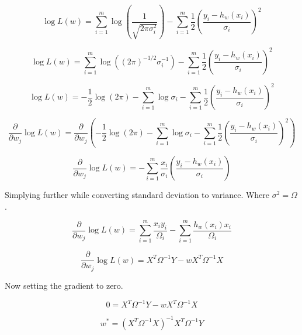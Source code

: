 \documentclass{report}
\begin{document}
  \begin{equation}
     \log L(w) = \sum_{i=1}^{m} \log \left(\frac{1}{\sqrt{2\pi\sigma_i^2}}\right)
     - \sum_{i=1}^{m} \frac{1}{2}\left(\frac{y_i-h_w(x_i)}{\sigma_i}\right)^2
  \end{equation}

  \begin{equation}
     \log L(w) = \sum_{i=1}^{m} \log \left((2\pi)^{-1/2}\sigma_i^{-1}\right)
     - \sum_{i=1}^{m} \frac{1}{2}\left(\frac{y_i-h_w(x_i)}{\sigma_i}\right)^2
  \end{equation}

  \begin{equation}
     \log L(w) = -\frac{1}{2} \log(2\pi)
     - \sum_{i=1}^{m} \log \sigma_i
     - \sum_{i=1}^{m} \frac{1}{2}\left(\frac{y_i-h_w(x_i)}{\sigma_i}\right)^2
  \end{equation}

\begin{equation}
     \frac{\partial}{\partial w_j} \log L(w)
     = \frac{\partial}{\partial w_j} \left(-\frac{1}{2} \log(2\pi)
     - \sum_{i=1}^{m} \log \sigma_i
     - \sum_{i=1}^{m} \frac{1}{2}\left(\frac{y_i-h_w(x_i)}{\sigma_i}\right)^2\right)
\end{equation}

\begin{equation}
     \frac{\partial}{\partial w_j} \log L(w) =
     - \sum_{i=1}^{m} \frac{x_i}{\sigma_i}\left(\frac{y_i-h_w(x_i)}{\sigma_i}\right)
\end{equation}

Simplying further while converting standard deviation to variance. Where $\sigma^2 = \Omega$.

\begin{equation}
     \frac{\partial}{\partial w_j} \log L(w) =
     \sum_{i=1}^{m} \frac{x_iy_i}{\Omega_i}
     - \sum_{i=1}^{m}\frac{h_w(x_i)x_i}{\Omega_i}
\end{equation}

\begin{equation}
     \frac{\partial}{\partial w_j} \log L(w) =
     X^T\Omega^{-1}Y - wX^T\Omega^{-1}X
\end{equation}

Now setting the gradient to zero.

\begin{equation}
     0 =X^T\Omega^{-1}Y
     - wX^T\Omega^{-1}X
\end{equation}

\begin{equation}
     w^* = (X^T\Omega^{-1} X)^{-1} X^T\Omega^{-1} Y
\end{equation}
\end{document}
